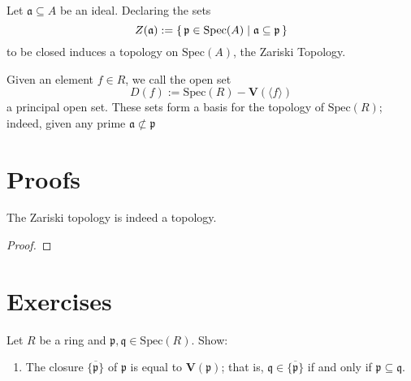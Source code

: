 \begin{defn}
    Let \(\mathfrak{a} \subseteq A\) be an ideal. Declaring the sets
    \begin{equation}
        Z(\mathfrak{a}) := \left\{\, \mathfrak{p} \in \mathrm{Spec}(A) \mathrel{\mid} \mathfrak{a} \subseteq \mathfrak{p} \,\right\}
    \end{equation}
    to be closed induces a topology on \(\mathrm{Spec}(A)\), the Zariski Topology.

    Given an element \(f \in R\), we call the open set
    \begin{equation}
        D(f) := \mathrm{Spec}(R) - \mathbf{V}(\langle f \rangle)
    \end{equation}
    a principal open set. These sets form a basis for the topology of \(\mathrm{Spec}(R)\); indeed, given any prime \(\mathfrak{a} \not\subset \mathfrak{p}\)
\end{defn}

\section{Proofs}

\begin{prps}
    The Zariski topology is indeed a topology.
\end{prps}
\begin{proof}
    
\end{proof}

\section{Exercises}
\begin{exr}
    Let \(R\) be a ring and \(\mathfrak{p}, \mathfrak{q} \in \mathrm{Spec}(R)\). Show:
    \begin{enumerate}
        \item The closure \(\overline{\{\mathfrak{p}\}}\) of \(\mathfrak{p}\) is equal to \(\mathbf{V}(\mathfrak{p})\); that is, \(\mathfrak{q} \in \overline{\{\mathfrak{p}\}}\) if and only if \(\mathfrak{p} \subseteq \mathfrak{q}\).
    \end{enumerate}
\end{exr}